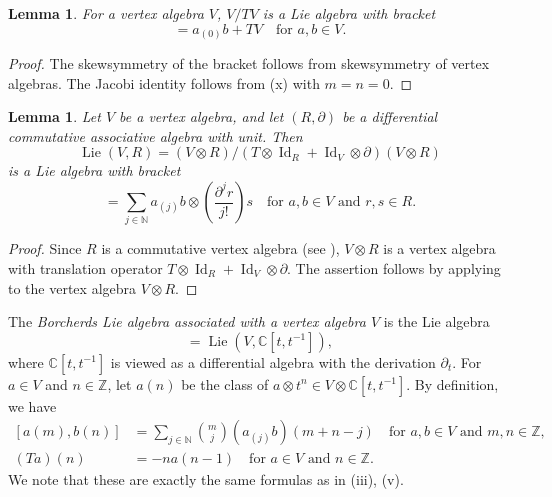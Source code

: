 \documentclass[a4paper, 12pt, reqno]{amsart}
\newtheorem{lemma}[theorem]{Lemma}
\theoremstyle{remark}
\DeclareMathOperator{\Id}{Id}
\DeclareMathOperator{\Lie}{Lie}
\begin{document}
\begin{lemma}
  \label{lmm:13}
  For a vertex algebra $V$, $V/TV$ is a Lie algebra with bracket
  \begin{equation*}
    [a + TV, b + TV] = a_{(0)}b + TV \quad \text{for $a, b \in V$}.
  \end{equation*}
\end{lemma}

\begin{proof}
  The skewsymmetry of the bracket follows from skewsymmetry of vertex algebras.
  The Jacobi identity follows from (x) with $m = n = 0$.
\end{proof}

\begin{lemma}
  \label{lmm:14}
  Let $V$ be a vertex algebra, and let $(R, \partial)$ be a differential commutative associative algebra with unit.
  Then
  \begin{equation*}
    \Lie(V, R) = (V \otimes R)/(T\otimes\Id_R + \Id_V\otimes\partial)(V \otimes R)
  \end{equation*}
  is a Lie algebra with bracket
  \begin{equation*}
    [a\otimes r, b\otimes s] = \sum_{j \in \mathbb{N}}a_{(j)}b\otimes\left(\frac{\partial^jr}{j!}\right)s \quad \text{for $a, b \in V$ and $r, s \in R$}.
  \end{equation*}
\end{lemma}

\begin{proof}
  Since $R$ is a commutative vertex algebra (see ), $V \otimes R$ is a vertex algebra with translation operator $T\otimes\Id_R + \Id_V\otimes\partial$.
  The assertion follows by applying  to the vertex algebra $V \otimes R$.
\end{proof}

The \emph{Borcherds Lie algebra associated with a vertex algebra $V$} is the Lie algebra
\begin{equation*}
  [V] = \Lie(V, \mathbb{C}[t, t^{-1}]),
\end{equation*}
where $\mathbb{C}[t, t^{-1}]$ is viewed as a differential algebra with the derivation $\partial_t$.
For $a \in V$ and $n \in \mathbb{Z}$, let $a(n)$ be the class of $a\otimes t^n \in V \otimes \mathbb{C}[t, t^{-1}]$.
By definition, we have
\begin{align}
  \label{eq:31}
  [a(m), b(n)] &= \sum_{j \in \mathbb{N}}\binom{m}{j}(a_{(j)}b)(m + n - j) \quad \text{for $a, b \in V$ and $m, n \in \mathbb{Z}$}, \\
  \label{eq:32}
  (Ta)(n) &= -na(n - 1) \quad \text{for $a \in V$ and $n \in \mathbb{Z}$}.
\end{align}
We note that these are exactly the same formulas as in (iii), (v).
\end{document}
